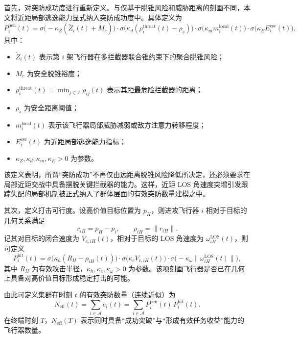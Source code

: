 首先，对突防成功度进行重新定义。与仅基于脱锥风险和威胁距离的刻画不同，本文将近距局部逃逸能力显式纳入突防成功度中。具体定义为
\begin{equation}
P_i^{\mathrm{pen}}(t)
=
\sigma\!\bigl(-\kappa_Z(\widetilde Z_i(t)+M_c)\bigr)
\cdot
\sigma\!\bigl(\kappa_d(\rho_i^{\mathrm{threat}}(t)-\rho_s)\bigr)
\cdot
\sigma\!\bigl(\kappa_m m_i^{\mathrm{local}}(t)\bigr)
\cdot
\sigma\!\bigl(\kappa_E E_i^{\mathrm{esc}}(t)\bigr),
\end{equation}
其中：

\begin{itemize}
  \item $\widetilde Z_i(t)$ 表示第 $i$ 架飞行器在多拦截器联合锥约束下的聚合脱锥风险；
  \item $M_c$ 为安全脱锥裕度；
  \item $\rho_i^{\mathrm{threat}}(t)=\min_{j\in\mathcal{I}}\rho_{ij}(t)$ 表示其距最危险拦截器的距离；
  \item $\rho_s$ 为安全距离阈值；
  \item $m_i^{\mathrm{local}}(t)$ 表示该飞行器局部威胁减弱或敌方注意力转移程度；
  \item $E_i^{\mathrm{esc}}(t)$ 为近距局部逃逸能力指标；
  \item $\kappa_Z,\kappa_d,\kappa_m,\kappa_E>0$ 为参数。
\end{itemize}

该定义表明，所谓“突防成功”不再仅由远距离脱锥风险降低所决定，还必须要求在局部近距交战中具备摆脱关键拦截器的能力。这样，近距 LOS 角速度突增引发跟踪失配的局部机制被正式纳入了群体层面的有效突防数量建模之中。

其次，定义打击可行度。设高价值目标位置为 $p_H$，则进攻飞行器 $i$ 相对于目标的几何关系满足
\[
r_{iH}=p_H-p_i,\qquad
\rho_{iH}=\|r_{iH}\|.
\]
记其对目标的闭合速度为 $V_{c,iH}(t)$，相对于目标的 LOS 角速度为 $\omega_{iH}^{\mathrm{LOS}}(t)$，则可定义
\begin{equation}
P_i^{\mathrm{hit}}(t)
=
\sigma\!\bigl(\kappa_h(R_H-\rho_{iH}(t))\bigr)
\cdot
\sigma\!\bigl(\kappa_c V_{c,iH}(t)\bigr)
\cdot
\sigma\!\bigl(-\kappa_{\omega}\|\omega_{iH}^{\mathrm{LOS}}(t)\|\bigr),
\end{equation}
其中 $R_H$ 为有效攻击半径，$\kappa_h,\kappa_c,\kappa_{\omega}>0$ 为参数。该项刻画飞行器是否已在几何上具备对高价值目标形成稳定打击的可能。

由此可定义集群在时刻 $t$ 的有效突防数量（连续近似）为
\begin{equation}
N_{\mathrm{eff}}(t)
=
\sum_{i\in\mathcal{A}} e_i(t)
=
\sum_{i\in\mathcal{A}} P_i^{\mathrm{pen}}(t)\,P_i^{\mathrm{hit}}(t).
\end{equation}
在终端时刻 $T$，$N_{\mathrm{eff}}(T)$ 表示同时具备“成功突破”与“形成有效任务收益”能力的飞行器数量。

